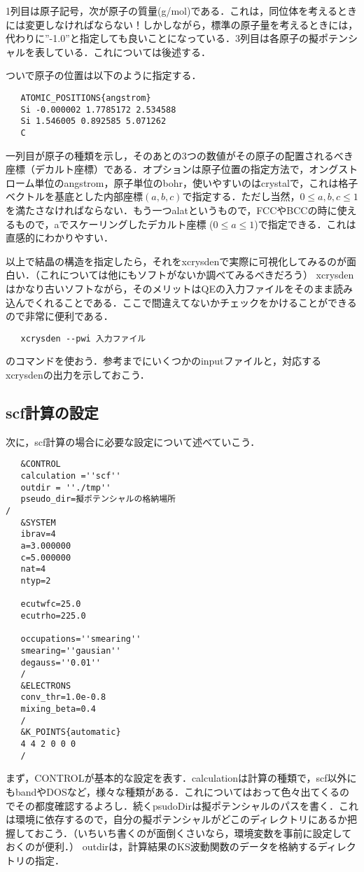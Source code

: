 \documentclass[a4j]{jarticle}
\begin{document}
  1列目は原子記号，次が原子の質量(g/mol)である．これは，同位体を考えるときには変更しなければならない！しかしながら，標準の原子量を考えるときには，代わりに''-1.0''と指定しても良いことになっている．3列目は各原子の擬ポテンシャルを表している．これについては後述する．

  ついで原子の位置は以下のように指定する．

  \begin{lstlisting}
   ATOMIC_POSITIONS{angstrom}
   Si -0.000002 1.7785172 2.534588
   Si 1.546005 0.892585 5.071262
   C
  \end{lstlisting}
  
一列目が原子の種類を示し，そのあとの3つの数値がその原子の配置されるべき座標（デカルト座標）である．オプションは原子位置の指定方法で，オングストローム単位のangstrom，原子単位のbohr，使いやすいのはcrystalで，これは格子ベクトルを基底とした内部座標$(a,b,c)$で指定する．ただし当然，$0\le a,b,c\le 1$を満たさなければならない．もう一つalatというもので，FCCやBCCの時に使えるもので，aでスケーリングしたデカルト座標 ($0\le a\le 1$)で指定できる．これは直感的にわかりやすい．

  以上で結晶の構造を指定したら，それをxcrysdenで実際に可視化してみるのが面白い．（これについては他にもソフトがないか調べてみるべきだろう）
  xcrysdenはかなり古いソフトながら，そのメリットはQEの入力ファイルをそのまま読み込んでくれることである．ここで間違えてないかチェックをかけることができるので非常に便利である．
  \begin{lstlisting}
   xcrysden --pwi 入力ファイル
  \end{lstlisting}
のコマンドを使おう．参考までにいくつかのinputファイルと，対応するxcrysdenの出力を示しておこう．



  \subsection{scf計算の設定}
  次に，scf計算の場合に必要な設定について述べていこう．
  \begin{lstlisting}
   &CONTROL
   calculation =''scf''
   outdir = ''./tmp''
   pseudo_dir=擬ポテンシャルの格納場所
/
   &SYSTEM
   ibrav=4
   a=3.000000
   c=5.000000
   nat=4
   ntyp=2

   ecutwfc=25.0
   ecutrho=225.0

   occupations=''smearing''
   smearing=''gausian''
   degauss=''0.01''
   /
   &ELECTRONS
   conv_thr=1.0e-0.8
   mixing_beta=0.4
   /
   &K_POINTS{automatic}
   4 4 2 0 0 0
   /
  \end{lstlisting}
  まず，CONTROLが基本的な設定を表す．calculationは計算の種類で，scf以外にもbandやDOSなど，様々な種類がある．これについてはおって色々出てくるのでその都度確認するよろし．続くpsudoDirは擬ポテンシャルのパスを書く．これは環境に依存するので，自分の擬ポテンシャルがどこのディレクトリにあるか把握しておこう．（いちいち書くのが面倒くさいなら，環境変数を事前に設定しておくのが便利．）
 outdirは，計算結果のKS波動関数のデータを格納するディレクトリの指定．
\end{document}
